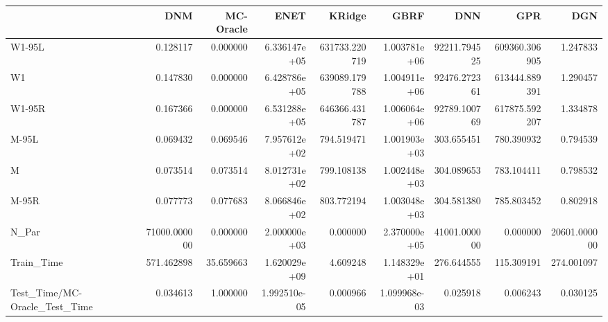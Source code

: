 \begin{tabular}{lrrrrrrrr}
\toprule
{} &           DNM &  MC-Oracle &          ENET &         KRidge &          GBRF &           DNN &            GPR &           DGN \\
\midrule
W1-95L                        &      0.128117 &   0.000000 &  6.336147e+05 &  631733.220719 &  1.003781e+06 &  92211.794525 &  609360.306905 &      1.247833 \\
W1                            &      0.147830 &   0.000000 &  6.428786e+05 &  639089.179788 &  1.004911e+06 &  92476.272361 &  613444.889391 &      1.290457 \\
W1-95R                        &      0.167366 &   0.000000 &  6.531288e+05 &  646366.431787 &  1.006064e+06 &  92789.100769 &  617875.592207 &      1.334878 \\
M-95L                         &      0.069432 &   0.069546 &  7.957612e+02 &     794.519471 &  1.001903e+03 &    303.655451 &     780.390932 &      0.794539 \\
M                             &      0.073514 &   0.073514 &  8.012731e+02 &     799.108138 &  1.002448e+03 &    304.089653 &     783.104411 &      0.798532 \\
M-95R                         &      0.077773 &   0.077683 &  8.066846e+02 &     803.772194 &  1.003048e+03 &    304.581380 &     785.803452 &      0.802918 \\
N\_Par                         &  71000.000000 &   0.000000 &  2.000000e+03 &       0.000000 &  2.370000e+05 &  41001.000000 &       0.000000 &  20601.000000 \\
Train\_Time                    &    571.462898 &  35.659663 &  1.620029e+09 &       4.609248 &  1.148329e+01 &    276.644555 &     115.309191 &    274.001097 \\
Test\_Time/MC-Oracle\_Test\_Time &      0.034613 &   1.000000 &  1.992510e-05 &       0.000966 &  1.099968e-03 &      0.025918 &       0.006243 &      0.030125 \\
\bottomrule
\end{tabular}
